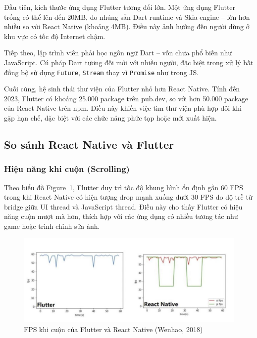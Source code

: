 Đầu tiên, kích thước ứng dụng Flutter tương đối lớn.  
Một ứng dụng Flutter trống có thể lên đến 20MB, do nhúng sẵn Dart runtime và Skia engine – lớn hơn nhiều so với React Native (khoảng 4MB).  
Điều này ảnh hưởng đến người dùng ở khu vực có tốc độ Internet chậm.

Tiếp theo, lập trình viên phải học ngôn ngữ Dart – vốn chưa phổ biến như JavaScript.  
Cú pháp Dart tương đối mới với nhiều người, đặc biệt trong xử lý bất đồng bộ sử dụng \texttt{Future}, \texttt{Stream} thay vì \texttt{Promise} như trong JS.

Cuối cùng, hệ sinh thái thư viện của Flutter nhỏ hơn React Native.  
Tính đến 2023, Flutter có khoảng 25.000 package trên pub.dev, so với hơn 50.000 package của React Native trên npm.  
Điều này khiến việc tìm thư viện phù hợp đôi khi gặp hạn chế, đặc biệt với các chức năng phức tạp hoặc mới xuất hiện.

\subsection{So sánh React Native và Flutter}
\renewcommand{\labelitemi}{--}

\subsubsection{Hiệu năng khi cuộn (Scrolling)}
\begin{flushleft}
  \hspace*{0.8cm}Theo biểu đồ Figure~\ref{fig:scrolling}, Flutter duy trì tốc độ khung hình ổn định gần 60 FPS trong khi React Native có hiện tượng drop mạnh xuống dưới 30 FPS do độ trễ từ bridge giữa UI thread và JavaScript thread. Điều này cho thấy Flutter có hiệu năng cuộn mượt mà hơn, thích hợp với các ứng dụng có nhiều tương tác như game hoặc trình chỉnh sửa ảnh.
\end{flushleft}

\begin{figure}[H]
    \centering
    \includegraphics[width=0.8\linewidth]{images/scrolling.png}
    \caption{FPS khi cuộn của Flutter và React Native (Wenhao, 2018)}
    \label{fig:scrolling}
\end{figure}

